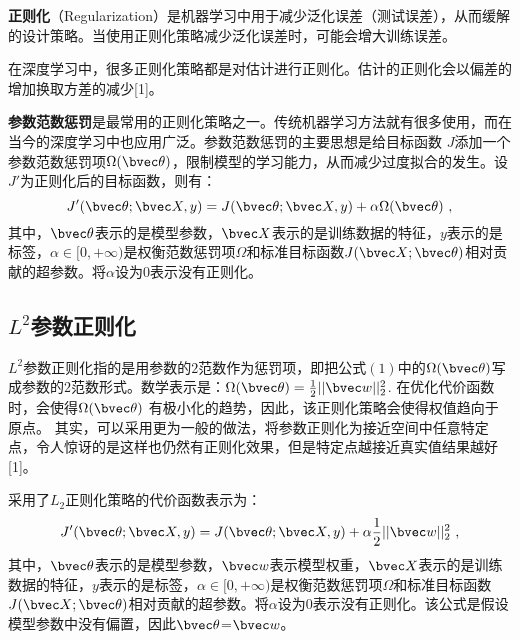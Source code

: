 


\textbf{正则化}（Regularization）是机器学习中用于减少泛化误差（测试误差），从而缓解的设计策略。当使用正则化策略减少泛化误差时，可能会增大训练误差。

在深度学习中，很多正则化策略都是对估计进行正则化。估计的正则化会以偏差的增加换取方差的减少[1]。

\textbf{参数范数惩罚}是最常用的正则化策略之一。传统机器学习方法就有很多使用，而在当今的深度学习中也应用广泛。参数范数惩罚的主要思想是给目标函数
$J$添加一个参数范数惩罚项$\Omega(\bvec \theta)$，限制模型的学习能力，从而减少过度拟合的发生。设$J'$为正则化后的目标函数，则有：
\begin{equation}
J'(\bvec \theta; \bvec X,y)=J(\bvec \theta;\bvec X,y)+\alpha\Omega(\bvec \theta)~,
\end{equation}
其中，$\bvec \theta$表示的是模型参数，$\bvec X$表示的是训练数据的特征，$y$表示的是标签，$\alpha\in[0,+\infty)$是权衡范数惩罚项$\Omega$和标准目标函数$J(\bvec X; \bvec \theta)$相对贡献的超参数。将$\alpha$设为$0$表示没有正则化。


\subsection{$L^2$参数正则化}

$L^2$参数正则化指的是用参数的$2$范数作为惩罚项，即把公式$(1)$中的$\Omega(\bvec \theta)$写成参数的$2$范数形式。数学表示是：$\Omega(\bvec \theta)=\frac{1}{2}||\bvec w||_2^2$.
在优化代价函数时，会使得$\Omega(\bvec \theta)$ 有极小化的趋势，因此，该正则化策略会使得权值趋向于原点。
其实，可以采用更为一般的做法，将参数正则化为接近空间中任意特定点，令人惊讶的是这样也仍然有正则化效果，但是特定点越接近真实值结果越好[1]。

采用了$L_2$正则化策略的代价函数表示为：
\begin{equation}
J'(\bvec \theta;\bvec X,y)=J(\bvec \theta;\bvec X,y)+\alpha\frac{1}{2}||\bvec w||_2^2~,
\end{equation}
其中，$\bvec \theta$表示的是模型参数，$\bvec w$表示模型权重，$\bvec X$表示的是训练数据的特征，$y$表示的是标签，$\alpha\in[0,+\infty)$是权衡范数惩罚项$\Omega$和标准目标函数$J(\bvec X; \bvec \theta)$相对贡献的超参数。将$\alpha$设为$0$表示没有正则化。该公式是假设模型参数中没有偏置，因此$\bvec \theta$=$\bvec w$。

